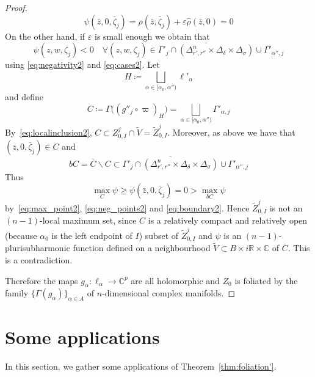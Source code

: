 \documentclass[reqno,oneside]{amsart}
\newcommand{\numberset}{\mathbb}
\newcommand{\R}{\numberset{R}}
\newcommand{\C}{\numberset{C}}
\renewcommand{\epsilon}{\varepsilon}
\theoremstyle{definition}
\theoremstyle{plain}
\theoremstyle{remark}
\begin{document}
\begin{proof}
\begin{equation}
        \psi(\bar{z},0,\bar\zeta_j)=\rho(\bar{z},\bar\zeta_j)+\epsilon\hat\rho(\bar{z},0)=0
    \end{equation}
    On the other hand, if $\epsilon$ is small enough we obtain that
    \begin{equation}
    \label{eq:neg_points2}
        \psi(z,w,\zeta_j)<0 \quad \forall(z,w,\zeta_j)\in\overline{\Gamma'_j\cap(\Delta_{r',r''}^n\times\Delta_\delta\times\Delta_\sigma)}\cup\Gamma'_{\alpha'',j}
    \end{equation}
    using \eqref{eq:negativity2} and \eqref{eq:cases2}. Let
    \[
        H\coloneqq\bigsqcup_{\alpha\in[\alpha_0,\alpha'')} \ell'_\alpha
    \]
    and define
    \[
        C\coloneqq\Gamma\bigl((g''_j\circ\varpi)_H\bigr)=\bigsqcup_{\alpha\in[\alpha_0,\alpha'')} \Gamma'_{\alpha,j}
    \]
    By~\eqref{eq:localinclusion2}, $C\subset Z_{0,I}^j\cap\tilde{V}=\tilde{Z}_{0,I}^j$. Moreover, as above we have that $(\bar{z},0,\bar\zeta_j)\in C$ and
    \begin{equation}
    \label{eq:boundary2}
        bC=\overline{C}\smallsetminus C\subset\overline{\Gamma'_j\cap(\Delta_{r',r''}^n\times\Delta_\delta\times\Delta_\sigma)}\cup\Gamma'_{\alpha'',j}
    \end{equation}
    Thus
    \[
        \max_{C}\psi\geq\psi(\bar{z},0,\bar\zeta_j)=0>\max_{bC}\psi
    \]
    by~\eqref{eq:max_point2}, \eqref{eq:neg_points2} and \eqref{eq:boundary2}. Hence $\tilde{Z}_{0,I}^j$ is not an $(n-1)$-local maximum set, since $C$ is a relatively compact and relatively open (because $\alpha_0$ is the left endpoint of $I$) subset of $\tilde{Z}^j_{0,I}$ and $\psi$ is an $(n-1)$-plurisubharmonic function defined on a neighbourhood $\tilde{V}\subset B\times i\R\times \C$ of $\overline{C}$. This is a contradiction.

	\bigskip
    Therefore the maps $g_\alpha:\ell_\alpha\to\C^p$ are all holomorphic and $Z_0$ is foliated by the family $\{\Gamma(g_\alpha)\}_{\alpha\in A}$ of $n$-dimensional complex manifolds.
\end{proof}

\section{Some applications}
\label{sec:applications}
In this section, we gather some applications of Theorem~\ref{thm:foliation'}.
\end{document}
